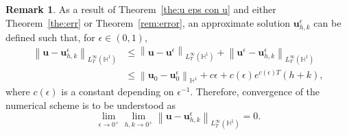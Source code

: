 \documentclass[11pt,reqno]{amsart}
\theoremstyle{definition}
\newtheorem{remark}[theorem]{Remark}
\numberwithin{equation}{section}
\newcommand{\bff}{\boldsymbol}
\newcommand{\bb}{\mathbb}
\newcommand{\norm}[2]{\left\|{#1}\right\|_{#2}}
\begin{document}
{
\begin{remark}
As a result of Theorem~\ref{the:u eps con u} and either Theorem~\ref{the:err} or Theorem~\ref{rem:error}, an approximate solution $\bff{u}_{h,k}^\epsilon$ can be defined such that, for $\epsilon\in (0,1)$,
\begin{align*}
    \norm{\bff{u}-\bff{u}_{h,k}^\epsilon}{L^\infty_T(\bb{H}^1)}
    &\leq
    \norm{\bff{u}- \bff{u}^\epsilon}{L^\infty_T(\bb{H}^1)} + 
    \norm{\bff{u}^\epsilon - \bff{u}_{h,k}^\epsilon}{L^\infty_T(\bb{H}^1)}
    \\
    &\leq
    \norm{\bff{u}_0- \bff{u}_0^\epsilon}{\bb{H}^1} + c\epsilon + c(\epsilon) e^{c(\epsilon)T} (h+k),
\end{align*}
where $c(\epsilon)$ is a constant depending on $\epsilon^{-1}$.
Therefore, convergence of the numerical scheme is to be understood as
\[
\lim_{\epsilon\to 0^+} \lim_{h,k\to 0^+} \norm{\bff{u}-\bff{u}_{h,k}^\epsilon}{L^\infty_T(\bb{H}^1)} = 0.
\]
\end{remark}
}
\end{document}
